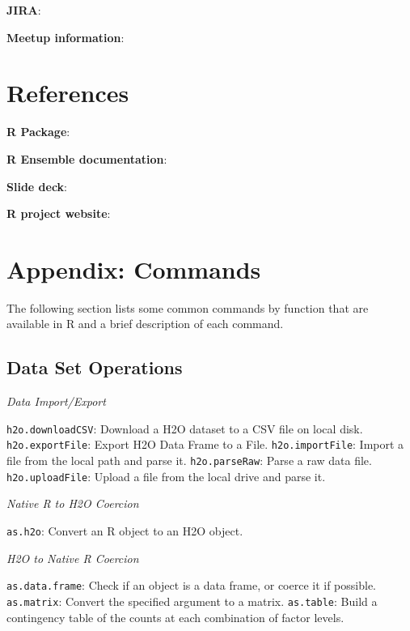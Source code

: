 \documentclass[11pt]{article}
\begin{document}
{\textbf{JIRA}}: {}

{\textbf{Meetup information}}: {}


\section{References}\bigskip


{\bfseries{R Package}}:  

{\bfseries{R Ensemble documentation}}:  

{\bfseries{Slide deck}}:  

{\bfseries{R project website}}:  


\section{Appendix: Commands} \label{Appendix} 

The following section lists some common commands by function that are available in R and a brief description of each command. \newline
\subsection {Data Set Operations}

{\emph{Data Import/Export}}\par
{\texttt{h2o.downloadCSV}}: Download a H2O dataset to a CSV file on local disk.\newline
{\texttt{h2o.exportFile}}: Export H2O Data Frame to a File.\newline
{\texttt{h2o.importFile}}: Import a file from the local path and parse it.\newline
{\texttt{h2o.parseRaw}}: Parse a raw data file. \newline
{\texttt{h2o.uploadFile}}: Upload a file from the local drive and parse it.\newline

{\emph{Native R to H2O Coercion}}\par
 {\texttt{as.h2o}}: Convert an R object to an H2O object.\newline


\emph{H2O to Native R Coercion}\par
{\texttt{as.data.frame}}: Check if an object is a data frame, or coerce it if possible.\newline
{\texttt{as.matrix}}: Convert the specified argument to a matrix.\newline
 {\texttt{as.table}}: Build a contingency table of the counts at each combination of factor levels.\newline
\end{document}
